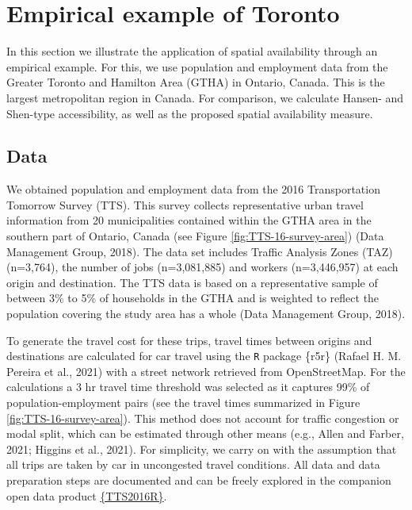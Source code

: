 \documentclass[]{elsarticle} %
\begin{document}
\hypertarget{empirical-example-of-toronto}{%
\section{Empirical example of
Toronto}\label{empirical-example-of-toronto}}

In this section we illustrate the application of spatial availability
through an empirical example. For this, we use population and employment
data from the Greater Toronto and Hamilton Area (GTHA) in Ontario,
Canada. This is the largest metropolitan region in Canada. For
comparison, we calculate Hansen- and Shen-type accessibility, as well as
the proposed spatial availability measure.

\hypertarget{data}{%
\subsection{Data}\label{data}}

We obtained population and employment data from the 2016 Transportation
Tomorrow Survey (TTS). This survey collects representative urban travel
information from 20 municipalities contained within the GTHA area in the
southern part of Ontario, Canada (see Figure
\ref{fig:TTS-16-survey-area}) (Data Management Group, 2018). The data
set includes Traffic Analysis Zones (TAZ) (n=3,764), the number of jobs
(n=3,081,885) and workers (n=3,446,957) at each origin and destination.
The TTS data is based on a representative sample of between 3\% to 5\%
of households in the GTHA and is weighted to reflect the population
covering the study area has a whole (Data Management Group, 2018).

To generate the travel cost for these trips, travel times between
origins and destinations are calculated for car travel using the
\texttt{R} package \{r5r\} (Rafael H. M. Pereira et al., 2021) with a
street network retrieved from OpenStreetMap. For the calculations a 3 hr
travel time threshold was selected as it captures 99\% of
population-employment pairs (see the travel times summarized in Figure
\ref{fig:TTS-16-survey-area}). This method does not account for traffic
congestion or modal split, which can be estimated through other means
(e.g., Allen and Farber, 2021; Higgins et al., 2021). For simplicity, we
carry on with the assumption that all trips are taken by car in
uncongested travel conditions. All data and data preparation steps are
documented and can be freely explored in the companion open data product
\href{https://soukhova.github.io/TTS2016R/}{\{TTS2016R\}}.
\end{document}

